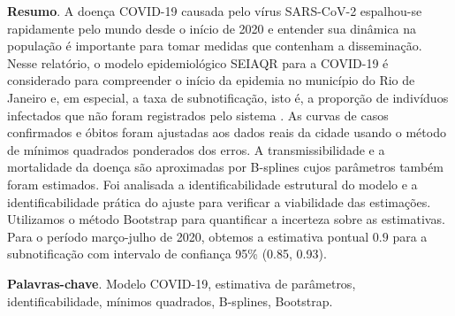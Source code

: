 {\bf Resumo}. A doença COVID-19 causada pelo vírus SARS-CoV-2 espalhou-se rapidamente pelo mundo desde o início de 2020 e entender sua dinâmica na população é importante para tomar medidas que contenham a disseminação. 
Nesse relatório, o modelo epidemiológico SEIAQR para a COVID-19 é considerado para compreender o início da epidemia no município do Rio de Janeiro e, em especial, a taxa de subnotificação, isto é, a proporção de indivíduos infectados que não foram registrados pelo sistema \cite{aronna2021}. 
As curvas de casos confirmados e óbitos foram ajustadas aos dados reais da cidade usando o método de mínimos quadrados ponderados dos erros. 
A transmissibilidade e a mortalidade da doença são aproximadas por B-splines cujos parâmetros também foram estimados. 
Foi analisada a identificabilidade estrutural do modelo e a identificabilidade prática do ajuste para verificar a viabilidade das estimações. Utilizamos o método Bootstrap para quantificar a incerteza sobre as estimativas. Para o período março-julho de 2020, obtemos a estimativa pontual $0.9$ para a subnotificação com intervalo de confiança 95\% (0.85, 0.93).

\noindent
{\bf Palavras-chave}. Modelo COVID-19, estimativa de parâmetros,
identificabilidade, mínimos quadrados, B-splines, Bootstrap.